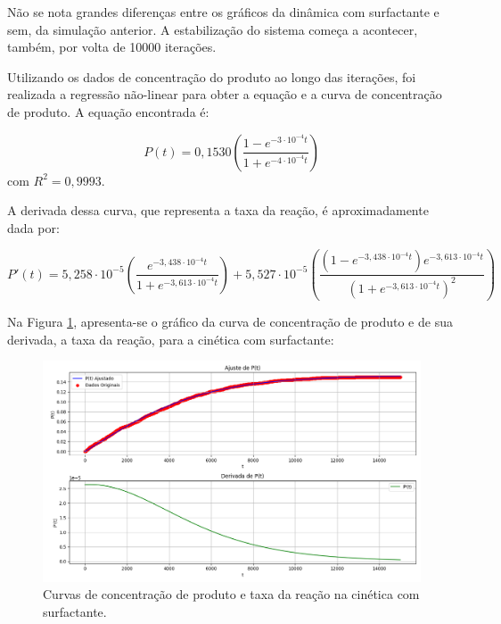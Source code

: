 \documentclass[12pt,oneside]{report}
\begin{document}
Não se nota grandes diferenças entre os gráficos da dinâmica com surfactante e sem, da simulação anterior. A estabilização do sistema começa a acontecer, também, por volta de 10000 iterações.

Utilizando os dados de concentração do produto ao longo das iterações, foi realizada a regressão não-linear para obter a equação e a curva de concentração de produto. A equação encontrada é:

\begin{equation}
    P(t) = 0{,}1530 \left(\frac{1 - e^{-3 \cdot 10^{-4} t}}{1 + e^{-4 \cdot 10^{-4} t}}\right)
    \label{eq:produto_MM_surfactant}
\end{equation}
com $R^2 = 0{,}9993$.

A derivada dessa curva, que representa a taxa da reação, é aproximadamente dada por:

\begin{equation}
    P'(t) = 5{,}258 \cdot 10^{-5} \left(\frac{e^{-3{,}438 \cdot 10^{-4} t}}{1 + e^{-3{,}613 \cdot 10^{-4} t}}\right) + 5{,}527 \cdot 10^{-5} \left(\frac{(1 - e^{-3{,}438 \cdot 10^{-4} t}) e^{-3{,}613 \cdot 10^{-4} t}}{(1 + e^{-3{,}613 \cdot 10^{-4} t})^2}\right)
    \label{eq:taxa_MM_surfactant}
\end{equation}

Na Figura \ref{fig:MM_surf_rate}, apresenta-se o gráfico da curva de concentração de produto e de sua derivada, a taxa da reação, para a cinética com surfactante:

\begin{figure}[H]
    \centering
    \includegraphics[width=1\textwidth]{MM_surf_rate.png}
    \caption{\small Curvas de concentração de produto e taxa da reação na cinética com surfactante.}
    \label{fig:MM_surf_rate}
\end{figure}
\end{document}
